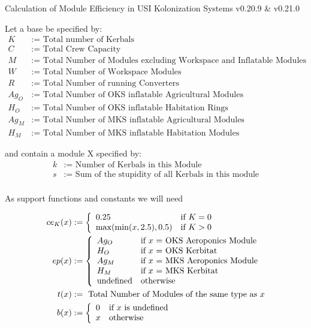 \documentclass[11pt]{report}
\begin{document}
Calculation of Module Efficiency in USI Kolonization Systems v0.20.9 \& v0.21.0

Let a base be specified by:
\begin{align*}
  K & := \textrm{ Total number of Kerbals}\\
  C & := \textrm{ Total Crew Capacity}\\
  M & := \textrm{ Total Number of Modules excluding Workspace and Inflatable Modules}\\
  W & := \textrm{ Total Number of Workspace Modules}\\
  R & := \textrm{ Total Number of running Converters}\\
  Ag_O & := \textrm{ Total Number of OKS inflatable Agricultural Modules}\\
  H_O & := \textrm{ Total Number of OKS inflatable Habitation Rings}\\
  Ag_M & := \textrm{ Total Number of MKS inflatable Agricultural Modules}\\
  H_M & := \textrm{ Total Number of MKS inflatable Habitation Modules}
\end{align*}

and contain a module X specified by:
\begin{align*}
  k & := \textrm{ Number of Kerbals in this Module}\\
  s & := \textrm{ Sum of the stupidity of all Kerbals in this module}\\
\end{align*}

As support functions and constants we will need

\begin{align*}
ce_K(x) & := \left\{
  \begin{array}{l l}
    0.25 & \textrm{if } K = 0\\
    \max(\min(x, 2.5), 0.5) &\textrm{if } K > 0
  \end{array}
\right.\\
ep(x) & :=\left\{
  \begin{array}{l l}
    Ag_O & \textrm{if $x$ = OKS Aeroponics Module}\\
    H_O & \textrm{if $x$ = OKS Kerbitat}\\
    Ag_M & \textrm{if $x$ = MKS Aeroponics Module}\\
    H_M & \textrm{if $x$ = MKS Kerbitat}\\
    \textrm{undefined} & \textrm{otherwise}
  \end{array}
\right.\\
t(x) & := \textrm{ Total Number of Modules of the same type as $x$}\\
b(x) & := \left\{
  \begin{array}{l l}
    0 & \textrm{if $x$ is undefined}\\
    x & \textrm{otherwise}
  \end{array}
\right.
\end{align*}
\end{document}
